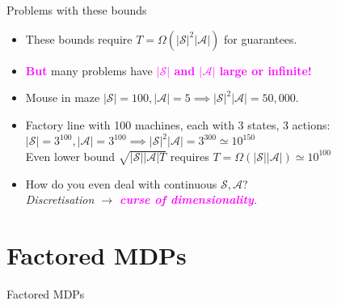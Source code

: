 \documentclass{beamer}
\newlength{\wideitemsep}
\let\olditem\item
\renewcommand{\item}{\setlength{\itemsep}{\wideitemsep}\olditem}
\newcommand{\Sc}{\mathcal{S}}
\newcommand{\Ac}{\mathcal{A}}
\newcommand{\bspace}{\vspace{3mm}}
\newcommand{\hilite}[1]{\textcolor{magenta}{\textbf{#1}}}
\begin{document}
\begin{frame}{Problems with these bounds}
\begin{itemize}
    \item These bounds require $T = \Omega(|\Sc|^2 |\Ac|)$ for guarantees.
    \bspace
    \item \hilite{But} many problems have \hilite{$|\Sc|$ and $|\Ac|$ large or infinite!}
    \bspace
    \item Mouse in maze $|\Sc|=100, |\Ac|=5 \implies |\Sc|^2 |\Ac| = 50,000$.
    \bspace
    \item Factory line with 100 machines, each with 3 states, 3 actions: \\
        $|\Sc| = 3^{100}, |\Ac| = 3^{100} \implies |\Sc|^2 |\Ac| = 3^{300} \simeq 10^{150}$ \\
        Even lower bound $\sqrt{|\Sc||\Ac|T}$ requires $T =\Omega(|\Sc||\Ac|) \simeq10^{100}$
    \bspace
    \item How do you even deal with continuous $\Sc, \Ac$? \\
        \emph{Discretisation $\rightarrow$ \hilite{curse of dimensionality}.}

\end{itemize}
\end{frame}
\section{Factored MDPs}

\begin{frame}
\begin{block}{\Huge{Factored MDPs}}
\end{block}
\end{frame}
\end{document}
